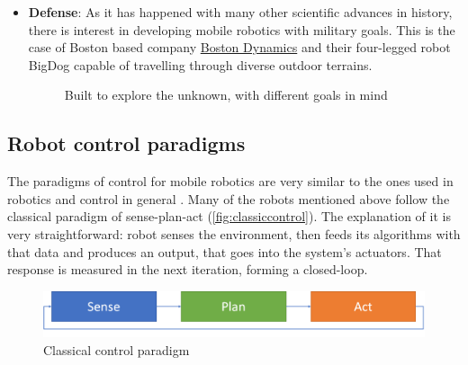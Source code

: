 \begin{itemize}
  \item \textbf{Defense}: As it has happened with many other scientific advances in history, there is interest in developing mobile robotics with military goals. This is the case of Boston based company \href{https://www.bostondynamics.com/}{Boston Dynamics} and their four-legged robot BigDog  capable of travelling through diverse outdoor terrains.

  \begin{figure}[t]
    \centering
     \quad
    \label{fig:curiosityboston}
    \caption[Curiosity and SpotMini robots]{Built to explore the unknown, with different goals in mind}
  \end{figure}
\end{itemize}

\subsection{Robot control paradigms}

The paradigms of control for mobile robotics are very similar to the ones used in robotics and control in general . Many of the robots mentioned above follow the classical paradigm of sense-plan-act (\autoref{fig:classiccontrol}). The explanation of it is very straightforward: robot senses the environment, then feeds its algorithms with that data and produces an output, that goes into the system's actuators. That response is measured in the next iteration, forming a closed-loop.

\begin{figure}[htb]
  \centering
  \includegraphics[width=\linewidth]{pictures/02/controlclassic}
  \caption{Classical control paradigm}
  \label{fig:classiccontrol}
\end{figure}

